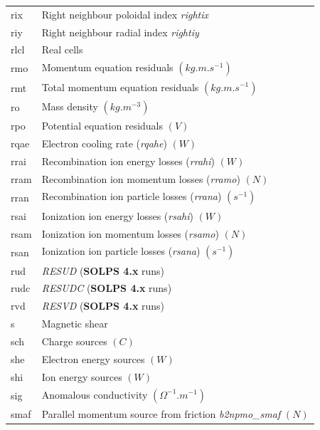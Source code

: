 \documentclass[a4paper,10pt]{report}
\newcommand\SOLPSfour{{\bf SOLPS 4.x} }
\begin{document}
\begin{center}
\begin{longtable}{|l|l|}
    rix      & \index{b2plot, rix} Right neighbour poloidal index {\em rightix} \\
    riy      & \index{b2plot, riy} Right neighbour radial index {\em rightiy} \\
    rlcl     & \index{b2plot, rlcl} Real cells \\
    rmo      & \index{b2plot, rmo} Momentum equation residuals $(kg.m.s^{-1})$ \\
    rmt      & \index{b2plot, rmt} Total momentum equation residuals $(kg.m.s^{-1})$ \\
    ro       & \index{b2plot, ro} Mass density $(kg.m^{-3})$ \\
    rpo      & \index{b2plot, rpo} Potential equation residuals $(V)$ \\
    rqae     & \index{b2plot, rqae} Electron cooling rate ({\em rqahe}) $(W)$ \\
    rrai     & \index{b2plot, rrai} Recombination ion energy losses ({\em rrahi}) $(W)$ \\
    rram     & \index{b2plot, rram} Recombination ion momentum losses ({\em rramo}) $(N)$ \\
    rran     & \index{b2plot, rran} Recombination ion particle losses ({\em rrana}) $(s^{-1})$ \\
    rsai     & \index{b2plot, rsai} Ionization ion energy losses ({\em rsahi}) $(W)$ \\
    rsam     & \index{b2plot, rsam} Ionization ion momentum losses ({\em rsamo}) $(N)$ \\
    rsan     & \index{b2plot, rsan} Ionization ion particle losses ({\em rsana}) $(s^{-1})$ \\
    rud      & \index{b2plot, rud} {\em RESUD} (\SOLPSfour runs) \\
    rudc     & \index{b2plot, rudc} {\em RESUDC} (\SOLPSfour runs) \\
    rvd      & \index{b2plot, rvd} {\em RESVD} (\SOLPSfour runs) \\
    s        & \index{b2plot, s} Magnetic shear \\
    sch      & \index{b2plot, sch} Charge sources $(C)$ \\
    she      & \index{b2plot, she} Electron energy sources $(W)$ \\
    shi      & \index{b2plot, shi} Ion energy sources $(W)$ \\
    sig      & \index{b2plot, sig} Anomalous conductivity $(\Omega^{-1}.m^{-1})$ \\
    smaf     & \index{b2plot, smaf} Parallel momentum source from friction {\em b2npmo\_smaf} $(N)$ \\

\end{longtable}
\end{center}
\end{document}
